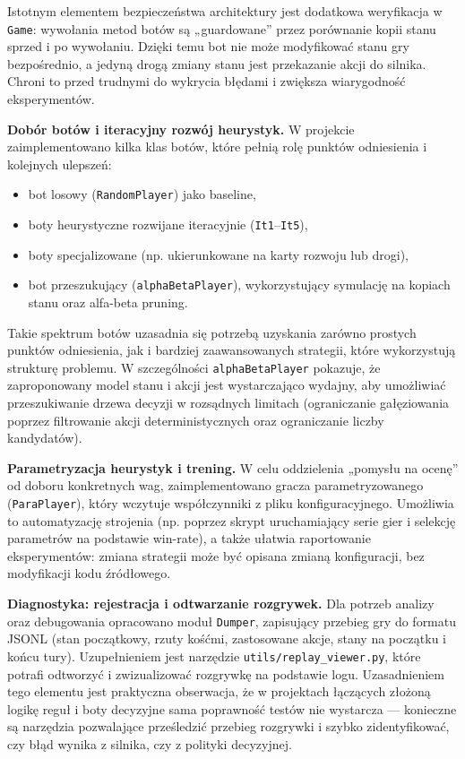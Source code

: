 \documentclass[polish,inz,longabstract]{iithesis}
\begin{document}
Istotnym elementem bezpieczeństwa architektury jest dodatkowa weryfikacja w \texttt{Game}: wywołania metod botów są „guardowane” przez porównanie kopii stanu sprzed i po wywołaniu. Dzięki temu bot nie może modyfikować stanu gry bezpośrednio, a jedyną drogą zmiany stanu jest przekazanie akcji do silnika. Chroni to przed trudnymi do wykrycia błędami i zwiększa wiarygodność eksperymentów.

\textbf{Dobór botów i iteracyjny rozwój heurystyk.} W projekcie zaimplementowano kilka klas botów, które pełnią rolę punktów odniesienia i kolejnych ulepszeń:
\begin{itemize}
\item bot losowy (\texttt{RandomPlayer}) jako baseline,
\item boty heurystyczne rozwijane iteracyjnie (\texttt{It1}–\texttt{It5}),
\item boty specjalizowane (np. ukierunkowane na karty rozwoju lub drogi),
\item bot przeszukujący (\texttt{alphaBetaPlayer}), wykorzystujący symulację na kopiach stanu oraz alfa-beta pruning.
\end{itemize}

Takie spektrum botów uzasadnia się potrzebą uzyskania zarówno prostych punktów odniesienia, jak i bardziej zaawansowanych strategii, które wykorzystują strukturę problemu. W szczególności \texttt{alphaBetaPlayer} pokazuje, że zaproponowany model stanu i akcji jest wystarczająco wydajny, aby umożliwiać przeszukiwanie drzewa decyzji w rozsądnych limitach (ograniczanie gałęziowania poprzez filtrowanie akcji deterministycznych oraz ograniczanie liczby kandydatów).

\textbf{Parametryzacja heurystyk i trening.} W celu oddzielenia „pomysłu na ocenę” od doboru konkretnych wag, zaimplementowano gracza parametryzowanego (\texttt{ParaPlayer}), który wczytuje współczynniki z pliku konfiguracyjnego. Umożliwia to automatyzację strojenia (np. poprzez skrypt uruchamiający serie gier i selekcję parametrów na podstawie win-rate), a także ułatwia raportowanie eksperymentów: zmiana strategii może być opisana zmianą konfiguracji, bez modyfikacji kodu źródłowego.

\textbf{Diagnostyka: rejestracja i odtwarzanie rozgrywek.} Dla potrzeb analizy oraz debugowania opracowano moduł \texttt{Dumper}, zapisujący przebieg gry do formatu JSONL (stan początkowy, rzuty kośćmi, zastosowane akcje, stany na początku i końcu tury). Uzupełnieniem jest narzędzie \texttt{utils/replay\_viewer.py}, które potrafi odtworzyć i zwizualizować rozgrywkę na podstawie logu. Uzasadnieniem tego elementu jest praktyczna obserwacja, że w projektach łączących złożoną logikę reguł i boty decyzyjne sama poprawność testów nie wystarcza — konieczne są narzędzia pozwalające prześledzić przebieg rozgrywki i szybko zidentyfikować, czy błąd wynika z silnika, czy z polityki decyzyjnej.
\end{document}
